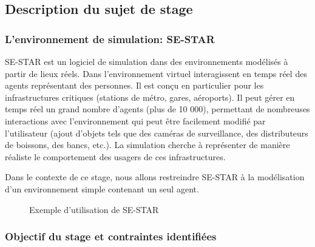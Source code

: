 \subsection{Description du sujet de stage}
\subsubsection{L'environnement de simulation: SE-STAR}

SE-STAR est un logiciel de simulation dans des environnements modélisés à partir
de lieux réels. Dans l’environnement virtuel interagissent en temps réel des
agents représentant des personnes. Il est conçu en particulier pour les
infrastructures critiques (stations de métro, gares, aéroports).
Il peut gérer en temps réel un grand nombre d’agents (plus de 10 000), permettant de nombreuses interactions avec l’environnement qui peut être facilement modifié par l’utilisateur (ajout d’objets tels que des caméras de surveillance, des distributeurs de boissons, des bancs, etc.). La simulation cherche à représenter de manière réaliste le comportement des usagers de ces infrastructures. 

Dans le contexte de ce stage, nous allons restreindre SE-STAR à la modélisation d'un environnement simple contenant un seul agent. 

\midskip
\begin{figure}[ht!]
    \: 
    \caption{Exemple d'utilisation de SE-STAR}
\label{some example}
\end{figure}

\subsubsection{Objectif du stage et contraintes identifiées}


